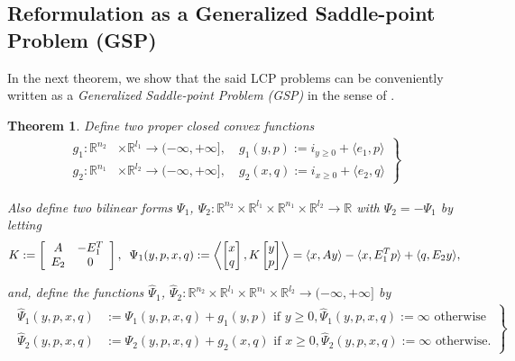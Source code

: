 \documentclass{article} %
\newtheorem{theorem}{Theorem} \newtheorem{lemma}[theorem]{Lemma}
\begin{document}
\subsection{Reformulation as a Generalized Saddle-point Problem (GSP)}
\label{sec:gsp}
In the next theorem, we show that the said LCP problems can be
conveniently written as a \textit{Generalized Saddle-point Problem
  (GSP)} in the sense of \cite{he2013accelerating}.
\begin{theorem}
Define two proper closed convex functions
  \begin{eqnarray}
    \left.
    \begin{aligned}
      g_1: \mathbb{R}^{n_2} &\times \mathbb{R}^{l_1} \rightarrow
      (-\infty, +\infty], \hspace{1em} g_1(y, p) :=
        i_{y \ge 0} + \langle e_1,p\rangle\\
        g_2: \mathbb{R}^{n_1} &\times \mathbb{R}^{l_2} \rightarrow
        (-\infty, +\infty],\hspace{1em} g_2(x, q) :=
          i_{x \ge 0} + \langle e_2, q\rangle
    \end{aligned}
    \right\}
    \label{eq:things}
  \end{eqnarray}

Also define two bilinear forms $\Psi_1$, $\Psi_2: \mathbb{R}^{n_2}
\times \mathbb{R}^{l_1} \times \mathbb{R}^{n_1} \times
\mathbb{R}^{l_2} \rightarrow \mathbb{R}$ with $\Psi_2 = -\Psi_1$ by letting
  \begin{equation}
      K :=
      \left[
        \begin{array}{cc}
          A & -E_1^T \\
          E_2 & 0
        \end{array}
        \right],\hspace{.5em}
    \Psi_1(y, p, x, q)
    := \left\langle \begin{bmatrix}x\\q\end{bmatrix},
      K\begin{bmatrix}y\\p\end{bmatrix}\right\rangle = \langle x,
      Ay\rangle -\langle x, E_1^Tp\rangle + \langle q, E_2y\rangle,
\end{equation}

and, define the functions $\hat{\Psi}_1$, $\hat{\Psi}_2:
\mathbb{R}^{n_2} \times \mathbb{R}^{l_1} \times \mathbb{R}^{n_1}
\times \mathbb{R}^{l_2} \rightarrow (-\infty, +\infty]$ by
\begin{eqnarray}
  \left.
  \begin{aligned}
    \hat{\Psi}_1(y, p, x, q) &:=
    \Psi_1(y, p, x, q)+ g_1(y, p) \text{ if }y \ge 0, \hat{\Psi}_1(y,
    p, x, q) := \infty \text{ otherwise}\\
    \hat{\Psi}_2(y, p, x, q) &:= \Psi_2(y, p, x, q)+ g_2(x, q) \text{ if
    }x \ge 0, \hat{\Psi}_2(y,p, x, q) := \infty \text{ otherwise}.
  \end{aligned}
  \right\}
\end{eqnarray}


\end{theorem}
\end{document}
